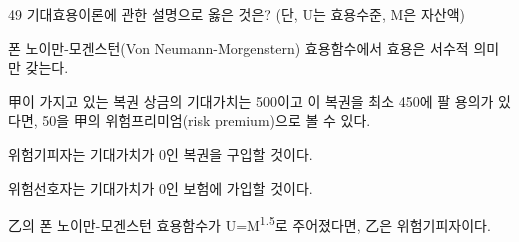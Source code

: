 \begin{question}{49}
기대효용이론에 관한 설명으로 옳은 것은? (단, U는 효용수준, M은 자산액)
\begin{choices}
  \item 폰 노이만-모겐스턴(Von Neumann-Morgenstern) 효용함수에서 효용은 서수적 의미만 갖는다.
  \item 甲이 가지고 있는 복권 상금의 기대가치는 500이고 이 복권을 최소 450에 팔 용의가 있다면, 50을 甲의 위험프리미엄(risk premium)으로 볼 수 있다.
  \item 위험기피자는 기대가치가 0인 복권을 구입할 것이다.
  \item 위험선호자는 기대가치가 0인 보험에 가입할 것이다.
  \item 乙의 폰 노이만-모겐스턴 효용함수가 U=M\textsuperscript{1.5}로 주어졌다면, 乙은 위험기피자이다.
\end{choices}
\end{question}
